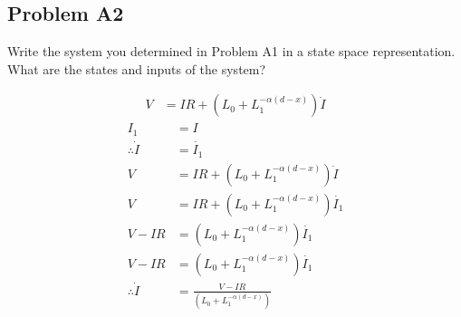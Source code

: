 \subsection*{Problem A2}
    Write the system you determined in Problem A1 in a state space representation. What are the states and inputs of the system?

    \begin{align}
        V &= IR + (L_{0} + L_{1} ^{- \alpha (d - x)})\dot{I}
    \end{align}
    \begin{align}
        I_1 &= I\nonumber\\
        \therefore \dot{I} &= \dot{I_1}\nonumber\\
        V &= IR + (L_{0} + L_{1} ^{- \alpha (d - x)})\dot{I}\nonumber\\
        V &= IR + (L_{0} + L_{1} ^{- \alpha (d - x)})\dot{I_1}\nonumber\\
        V - IR &= (L_{0} + L_{1} ^{- \alpha (d - x)})\dot{I_1}\nonumber\\
        V - IR &= (L_{0} + L_{1} ^{- \alpha (d - x)})\dot{I_1}\nonumber\\
        \therefore
        \dot{I} &= \frac{V - IR}{(L_{0} + L_{1} ^{- \alpha (d - x)})}
    \end{align}



